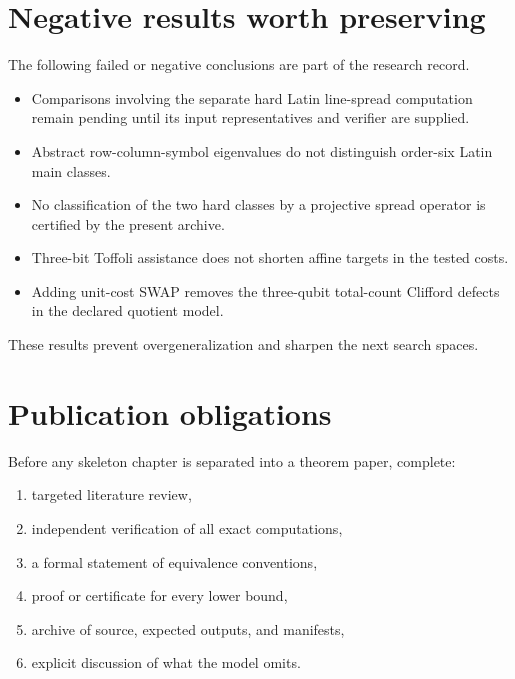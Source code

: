 \section{Negative results worth preserving}
The following failed or negative conclusions are part of the research record.
\begin{itemize}
\item Comparisons involving the separate hard Latin line-spread computation remain pending until its input representatives and verifier are supplied.
\item Abstract row-column-symbol eigenvalues do not distinguish order-six Latin main classes.
\item No classification of the two hard classes by a projective spread operator is certified by the present archive.
\item Three-bit Toffoli assistance does not shorten affine targets in the tested costs.
\item Adding unit-cost SWAP removes the three-qubit total-count Clifford defects in the declared quotient model.
\end{itemize}
These results prevent overgeneralization and sharpen the next search spaces.

\section{Publication obligations}
Before any skeleton chapter is separated into a theorem paper, complete:
\begin{enumerate}
\item targeted literature review,
\item independent verification of all exact computations,
\item a formal statement of equivalence conventions,
\item proof or certificate for every lower bound,
\item archive of source, expected outputs, and manifests,
\item explicit discussion of what the model omits.
\end{enumerate}
